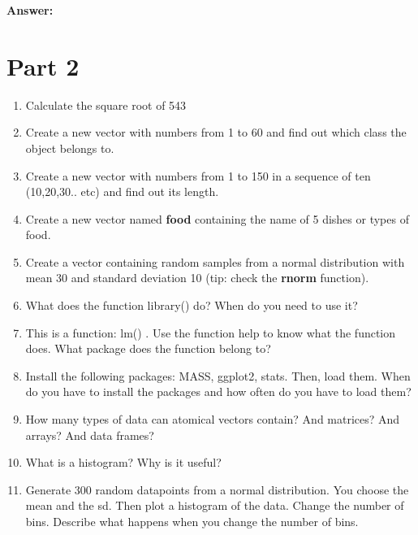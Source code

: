 \documentclass[]{article}
\begin{document}
\textbf{Answer:}

\section{Part 2}\label{part-2}

\begin{enumerate}
\def\labelenumi{\arabic{enumi}.}
\setcounter{enumi}{1}
\item
  Calculate the square root of 543
\item
  Create a new vector with numbers from 1 to 60 and find out which class
  the object belongs to.
\item
  Create a new vector with numbers from 1 to 150 in a sequence of ten
  (10,20,30.. etc) and find out its length.
\item
  Create a new vector named \textbf{food} containing the name of 5
  dishes or types of food.
\item
  Create a vector containing random samples from a normal distribution
  with mean 30 and standard deviation 10 (tip: check the \textbf{rnorm}
  function).
\item
  What does the function library() do? When do you need to use it?
\item
  This is a function: lm() . Use the function help to know what the
  function does. What package does the function belong to?
\item
  Install the following packages: MASS, ggplot2, stats. Then, load them.
  When do you have to install the packages and how often do you have to
  load them?
\item
  How many types of data can atomical vectors contain? And matrices? And
  arrays? And data frames?
\item
  What is a histogram? Why is it useful?
\item
  Generate 300 random datapoints from a normal distribution. You choose
  the mean and the sd. Then plot a histogram of the data. Change the
  number of bins. Describe what happens when you change the number of
  bins.
\end{enumerate}
\end{document}
